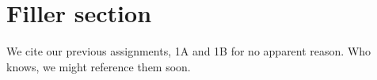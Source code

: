 \documentclass[12pt]{article}
\begin{document}
\pagebreak

\section{Filler section}

We cite our previous assignments, 1A \cite{assign1aref} and 1B \cite{assign1bref} for no apparent reason. Who knows, we might reference them soon.

\pagebreak



\end{document}
